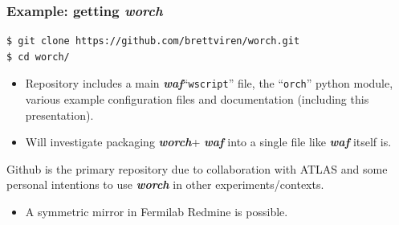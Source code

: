 \documentclass[xcolor=dvipsnames]{beamer}
\newcommand{\app}[1]{\textbf{\textit{#1}}\xspace}
\def\waf{\app{waf}}
\def\worch{\app{worch}}
\begin{document}
\begin{frame}[fragile]
  \frametitle{Example: getting \worch}

\begin{verbatim}
$ git clone https://github.com/brettviren/worch.git
$ cd worch/
\end{verbatim}

  \begin{itemize}
  \item   Repository includes a main \waf ``\texttt{wscript}'' file, the ``\texttt{orch}'' python module, various example configuration files and documentation (including this presentation).

  \item   Will investigate packaging \worch + \waf into a single file like \waf itself is.

  \end{itemize}

  Github is the primary repository due to collaboration with ATLAS and
  some personal intentions to use \worch in other
  experiments/contexts.
    \begin{itemize}
    \item A symmetric mirror in Fermilab Redmine is possible.
    \end{itemize}


\end{frame}
\end{document}
